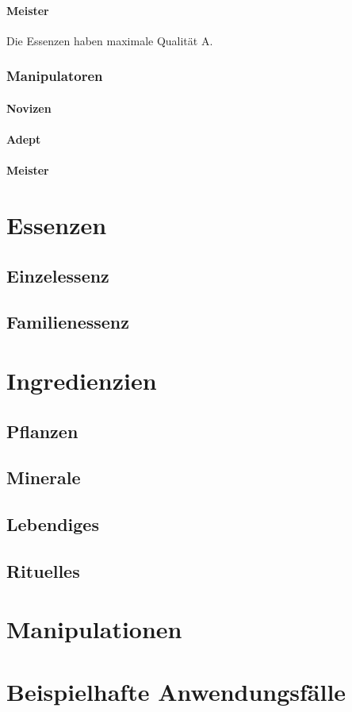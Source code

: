 \documentclass[a4paper,12pt,oneside]{book}
\begin{document}
\subsection{Meister}
Die Essenzen haben maximale Qualität A.

\section{Manipulatoren}

\subsection{Novizen}

\subsection{Adept}

\subsection{Meister}

\part{Essenzen}

\chapter{Einzelessenz}

\chapter{Familienessenz}

\part{Ingredienzien}
\chapter{Pflanzen}

\chapter{Minerale}

\chapter{Lebendiges}

\chapter{Rituelles}



\part{Manipulationen}

\part{Beispielhafte Anwendungsfälle}
\end{document}
